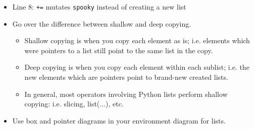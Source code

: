 \begin{blocksection}
\begin{guide}
\begin{itemize}
    \item Line 8: \lstinline{+=} mutates \lstinline{spooky} instead of creating a new list 
    \item Go over the difference between shallow and deep copying.
    \begin{itemize}
			\item Shallow copying is when you copy each element as is; i.e. elements which were pointers to a list still point to the same list in the copy.
			\item Deep copying is when you copy each element within each sublist; i.e. the new elements which are pointers point to brand-new created lists.
			\item In general, most operators involving Python lists perform shallow copying: i.e. slicing, list(...), etc. 
    \end{itemize}
    \item Use box and pointer diagrams in your environment diagram for lists.
  \end{itemize}
\end{guide}
\end{blocksection}